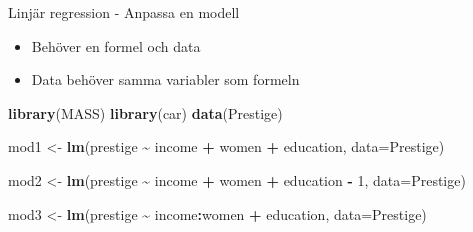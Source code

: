 \documentclass[
  11pt,
  ignorenonframetext,
  handout]{beamer}
\newenvironment{Shaded}{\begin{snugshade}}{\end{snugshade}}
\newcommand{\AttributeTok}[1]{\textcolor[rgb]{0.13,0.29,0.53}{#1}}
\newcommand{\DecValTok}[1]{\textcolor[rgb]{0.00,0.00,0.81}{#1}}
\newcommand{\FunctionTok}[1]{\textcolor[rgb]{0.13,0.29,0.53}{\textbf{#1}}}
\newcommand{\NormalTok}[1]{#1}
\newcommand{\OtherTok}[1]{\textcolor[rgb]{0.56,0.35,0.01}{#1}}
\newcommand{\SpecialCharTok}[1]{\textcolor[rgb]{0.81,0.36,0.00}{\textbf{#1}}}
\providecommand{\tightlist}{%
  \setlength{\itemsep}{0pt}\setlength{\parskip}{0pt}}
\begin{document}
\begin{frame}[fragile]{Linjär regression - Anpassa en modell}
\label{linjuxe4r-regression---anpassa-en-modell}
\begin{itemize}
\tightlist
\item
  Behöver en formel och data
\item
  Data behöver samma variabler som formeln
\end{itemize}

\begin{Shaded}
\begin{Highlighting}[]
\FunctionTok{library}\NormalTok{(MASS)}
\FunctionTok{library}\NormalTok{(car)}
\FunctionTok{data}\NormalTok{(Prestige)}
\end{Highlighting}
\end{Shaded}

\begin{Shaded}
\begin{Highlighting}[]
\NormalTok{mod1 }\OtherTok{\textless{}{-}} \FunctionTok{lm}\NormalTok{(prestige }\SpecialCharTok{\textasciitilde{}}\NormalTok{ income }\SpecialCharTok{+}\NormalTok{ women }\SpecialCharTok{+}\NormalTok{ education, }\AttributeTok{data=}\NormalTok{Prestige)}
\end{Highlighting}
\end{Shaded}

\begin{Shaded}
\begin{Highlighting}[]
\NormalTok{mod2 }\OtherTok{\textless{}{-}} \FunctionTok{lm}\NormalTok{(prestige }\SpecialCharTok{\textasciitilde{}}\NormalTok{ income }\SpecialCharTok{+}\NormalTok{ women }\SpecialCharTok{+}\NormalTok{ education }\SpecialCharTok{{-}} \DecValTok{1}\NormalTok{, }\AttributeTok{data=}\NormalTok{Prestige)}
\end{Highlighting}
\end{Shaded}

\begin{Shaded}
\begin{Highlighting}[]
\NormalTok{mod3 }\OtherTok{\textless{}{-}} \FunctionTok{lm}\NormalTok{(prestige }\SpecialCharTok{\textasciitilde{}}\NormalTok{ income}\SpecialCharTok{:}\NormalTok{women }\SpecialCharTok{+}\NormalTok{ education, }\AttributeTok{data=}\NormalTok{Prestige)}
\end{Highlighting}
\end{Shaded}
\end{frame}
\end{document}
